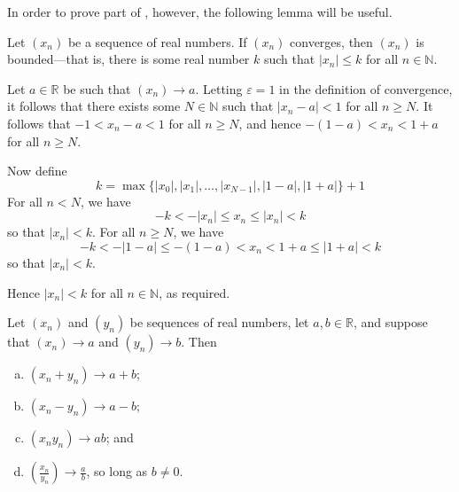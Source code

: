 In order to prove part of , however, the following lemma will be useful.

\begin{lemma}
\label{lemConvergentSequencesAreBounded}
Let $(x_n)$ be a sequence of real numbers. If $(x_n)$ converges, then $(x_n)$ is bounded---that is, there is some real number $k$ such that $|x_n| \le k$ for all $n \in \mathbb{N}$.
\end{lemma}

\begin{cproof}
Let $a \in \mathbb{R}$ be such that $(x_n) \to a$. Letting $\varepsilon = 1$ in the definition of convergence, it follows that there exists some $N \in \mathbb{N}$ such that $|x_n-a| < 1$ for all $n \ge N$. It follows that $-1 < x_n-a < 1$ for all $n \ge N$, and hence $-(1-a) < x_n < 1+a$ for all $n \ge N$.

Now define
\[ k = \max \{ |x_0|, |x_1|, \dots, |x_{N-1}|, |1-a|, |1+a| \} + 1 \]
For all $n < N$, we have
\[ -k < -|x_n| \le x_n \le |x_n| < k \]
so that $|x_n| < k$. For all $n \ge N$, we have
\[ -k < -|1-a| \le -(1-a) < x_n < 1+a \le |1+a| < k \]
so that $|x_n| < k$.

Hence $|x_n| < k$ for all $n \in \mathbb{N}$, as required.
\end{cproof}

\begin{theorem}
\label{thmLimitsPreserveArithmeticOperations}
Let $(x_n)$ and $(y_n)$ be sequences of real numbers, let $a,b \in \mathbb{R}$, and suppose that $(x_n) \to a$ and $(y_n) \to b$. Then
\begin{enumerate}[(a)]
\item $(x_n+y_n) \to a+b$;
\item $(x_n-y_n) \to a-b$;
\item $(x_ny_n) \to ab$; and
\item $(\frac{x_n}{y_n}) \to \frac{a}{b}$, so long as $b \ne 0$.
\end{enumerate}
\end{theorem}

